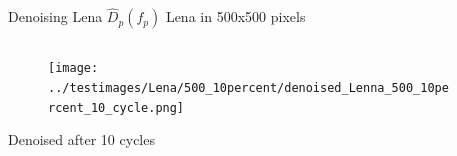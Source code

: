 \documentclass[mathserif]{beamer}
\begin{document}
\begin{frame}{Denoising Lena $\hat D_p(f_p)$ }
    Lena in 500x500 pixels
    \begin{columns}
        \begin{column}{.45\textwidth}
                \begin{figure}
                    \centering
                    \texttt{[image: ../testimages/Lena/500\_10percent/denoised\_Lenna\_500\_10percent\_10\_cycle.png]}
                \end{figure}
                    {Denoised after 10 cycles}%
        \end{column}
        \begin{column}{.45\textwidth}
        \end{column}
    \end{columns}
\end{frame}
\end{document}
